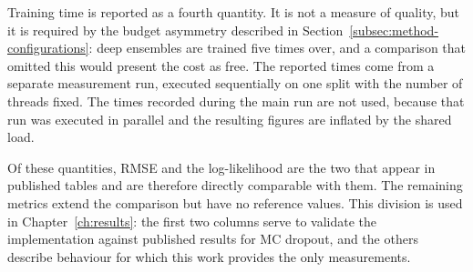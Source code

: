 Training time is reported as a fourth quantity. It is not a measure of quality, but it
is required by the budget asymmetry described in
Section~\ref{subsec:method-configurations}: deep ensembles are trained five times over, and
a comparison that omitted this would present the cost as free. The reported times come
from a separate measurement run, executed sequentially on one split with the number of
threads fixed. The times recorded during the main run are not used, because that run was
executed in parallel and the resulting figures are inflated by the shared load.

Of these quantities, RMSE and the log-likelihood are the two that appear in published
tables and are therefore directly comparable with them. The remaining metrics extend the
comparison but have no reference values. This division is used in
Chapter~\ref{ch:results}: the first two columns serve to validate the implementation
against published results for MC dropout, and the others describe behaviour for which
this work provides the only measurements.
